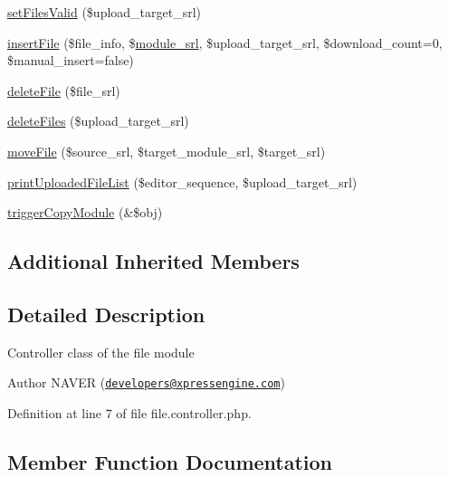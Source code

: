 \begin{DoxyCompactItemize}
\item 
\hyperlink{classfileController_a801efe17bf09b43279f82504b748c5ee}{set\+Files\+Valid} (\$upload\+\_\+target\+\_\+srl)
\item 
\hyperlink{classfileController_aa9247b382342e097dcd71dac7b944c50}{insert\+File} (\$file\+\_\+info, \$\hyperlink{ko_8install_8php_a370bb6450fab1da3e0ed9f484a38b761}{module\+\_\+srl}, \$upload\+\_\+target\+\_\+srl, \$download\+\_\+count=0, \$manual\+\_\+insert=false)
\item 
\hyperlink{classfileController_a98775c010ad21e88fd590c0a35b9c405}{delete\+File} (\$file\+\_\+srl)
\item 
\hyperlink{classfileController_ae3060e078930eeaae0c939d7a1c4f229}{delete\+Files} (\$upload\+\_\+target\+\_\+srl)
\item 
\hyperlink{classfileController_aae914224f7bc02d907004c3fb1dd29ac}{move\+File} (\$source\+\_\+srl, \$target\+\_\+module\+\_\+srl, \$target\+\_\+srl)
\item 
\hyperlink{classfileController_a99cefbd1c15aeb48b68903e77f9041c7}{print\+Uploaded\+File\+List} (\$editor\+\_\+sequence, \$upload\+\_\+target\+\_\+srl)
\item 
\hyperlink{classfileController_a043759003f14e91db0f4fb554955fba8}{trigger\+Copy\+Module} (\&\$obj)
\end{DoxyCompactItemize}
\subsection*{Additional Inherited Members}


\subsection{Detailed Description}
Controller class of the file module \begin{DoxyAuthor}{Author}
N\+A\+V\+E\+R (\href{mailto:developers@xpressengine.com}{\tt developers@xpressengine.\+com}) 
\end{DoxyAuthor}


Definition at line 7 of file file.\+controller.\+php.



\subsection{Member Function Documentation}
\hypertarget{classfileController_a98775c010ad21e88fd590c0a35b9c405}{}
